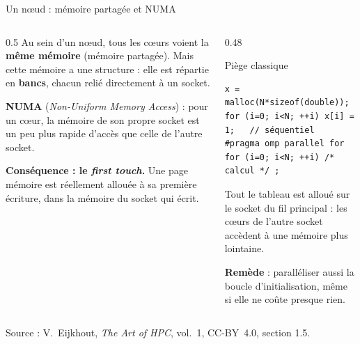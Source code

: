 \documentclass[8pt,aspectratio=169]{beamer}
\newcommand{\src}[1]{\vfill{\tiny\color{gray}Source : #1\par}}
\newcommand{\eij}{V.~Eijkhout, \emph{The Art of HPC}, vol.~1, CC-BY~4.0}
\begin{document}
\begin{frame}[fragile]{Un nœud : mémoire partagée et NUMA}
\begin{columns}[T]
\begin{column}{0.5\textwidth}
Au sein d'un nœud, tous les cœurs voient la \textbf{même mémoire} (mémoire partagée). Mais cette mémoire a une structure : elle est répartie en \textbf{bancs}, chacun relié directement à un socket.

\medskip
\textbf{NUMA} (\emph{Non-Uniform Memory Access}) : pour un cœur, la mémoire de son propre socket est un peu plus rapide d'accès que celle de l'autre socket.

\medskip
\textbf{Conséquence : le \emph{first touch}.} Une page mémoire est réellement allouée à sa première écriture, dans la mémoire du socket qui écrit.
\end{column}
\begin{column}{0.48\textwidth}
\begin{block}{Piège classique}
\begin{verbatim}
x = malloc(N*sizeof(double));
for (i=0; i<N; ++i) x[i] = 1;   // séquentiel
#pragma omp parallel for
for (i=0; i<N; ++i) /* calcul */ ;
\end{verbatim}
Tout le tableau est alloué sur le socket du fil principal : les cœurs de l'autre socket accèdent à une mémoire plus lointaine.
\end{block}
\textbf{Remède} : paralléliser aussi la boucle d'initialisation, même si elle ne coûte presque rien.
\end{column}
\end{columns}
\src{\eij{}, section 1.5.}
\end{frame}
\end{document}

